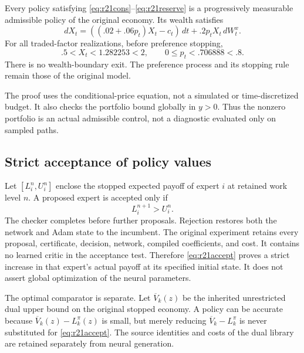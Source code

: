 \begin{theorem}\label{thm:r21finance}
Every policy satisfying \eqref{eq:r21cons}--\eqref{eq:r21reserve} is a progressively measurable admissible policy of the original economy. Its wealth satisfies
\[
 dX_t=((.02+.06p_t)X_t-c_t)\,dt+.2p_tX_t\,dW^x_t.
\]
For all traded-factor realizations, before preference stopping,
\[
 .5<X_t<1.282253<2,\qquad 0\leq p_t<.706888<.8.
\]
There is no wealth-boundary exit. The preference process and its stopping rule remain those of the original model.
\end{theorem}
The proof uses the conditional-price equation, not a simulated or time-discretized budget. It also checks the portfolio bound globally in $y>0$. Thus the nonzero portfolio is an actual admissible control, not a diagnostic evaluated only on sampled paths.

\subsection{Strict acceptance of policy values}
Let $[L_i^n,U_i^n]$ enclose the stopped expected payoff of expert $i$ at retained work level $n$. A proposed expert is accepted only if
\begin{equation}
 L_i^{n+1}>U_i^n.\label{eq:r21accept}
\end{equation}
The checker completes before further proposals. Rejection restores both the network and Adam state to the incumbent. The original experiment retains every proposal, certificate, decision, network, compiled coefficients, and cost. It contains no learned critic in the acceptance test. Therefore \eqref{eq:r21accept} proves a strict increase in that expert's actual payoff at its specified initial state. It does not assert global optimization of the neural parameters.

The optimal comparator is separate. Let $\overline V_k(z)$ be the inherited unrestricted dual upper bound on the original stopped economy. A policy can be accurate because $\overline V_k(z)-L^\pi_k(z)$ is small, but merely reducing $\overline V_k-L^\pi_k$ is never substituted for \eqref{eq:r21accept}. The source identities and costs of the dual library are retained separately from neural generation.


